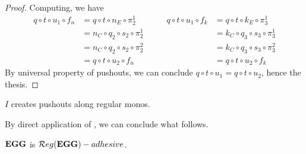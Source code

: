 \begin{proof}
	Computing, we have
	\[
		\begin{split}
			q \circ t \circ u_1 \circ f_n &= q \circ t \circ n_E \circ \pi_2^1 \\ &= n_C \circ q_2 \circ s_2 \circ \pi_2^1 \\&= n_C \circ q_2 \circ s_2 \circ \pi_2^2 \\&=q \circ t \circ u_2 \circ f_n 
			\end{split}
			\qquad
			\begin{split} q \circ t \circ u_1 \circ f_k &= q \circ t \circ k_E \circ \pi_3^1 \\ &= k_C \circ q_3 \circ s_3 \circ \pi_3^1 \\&= k_C \circ q_3 \circ s_3 \circ \pi_3^2 \\&=q \circ t \circ u_2 \circ f_k
			\end{split}
	\]
	By universal property of pushouts, we can conclude $q \circ t \circ u_1 = q \circ t \circ u_2$, hence the thesis.
\end{proof}


\begin{cor}
	$I$ creates pushouts along regular monos.
\end{cor}

By direct application of , we can conclude what follows.

\begin{cor}
	$\mathbf{EGG}$ is $\mathcal{R}eg(\mathbf{EGG})-adhesive$.
\end{cor}





